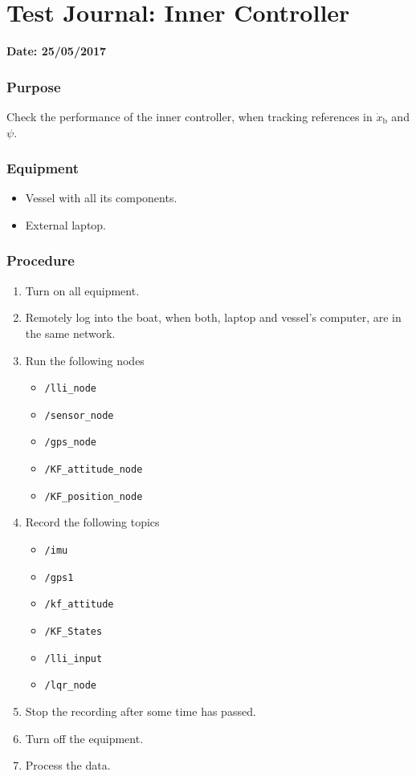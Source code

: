 \chapter{Test Journal: Inner Controller} \label{app:Inner}

\textbf{Date: 25/05/2017}

\subsection*{Purpose}
Check the performance of the inner controller, when tracking references in $\dot{x}_\mathrm{b}$ and $\psi$.

\subsection*{Equipment}
\begin{itemize}
    \item Vessel with all its components. 
    \item External laptop.
\end{itemize}

\subsection*{Procedure}
\begin{enumerate}
    \item Turn on all equipment.
    \item Remotely log into the boat, when both, laptop and vessel's computer, are in the same network.
    \item Run the following nodes
    \begin{itemize}
        \item \lstinline[style=cinline]{/lli_node}
        \item \lstinline[style=cinline]{/sensor_node}
        \item \lstinline[style=cinline]{/gps_node}
        \item \lstinline[style=cinline]{/KF_attitude_node}
        \item \lstinline[style=cinline]{/KF_position_node}  
    \end{itemize}
    \item Record the following topics
    \begin{itemize}
        \item \lstinline[style=cinline]{/imu}   
        \item \lstinline[style=cinline]{/gps1}
        \item \lstinline[style=cinline]{/kf_attitude}
        \item \lstinline[style=cinline]{/KF_States}   
        \item \lstinline[style=cinline]{/lli_input}  
        \item \lstinline[style=cinline]{/lqr_node}
    \end{itemize}
    \item Stop the recording after some time has passed.
    \item Turn off the equipment.
    \item Process the data.
\end{enumerate}

